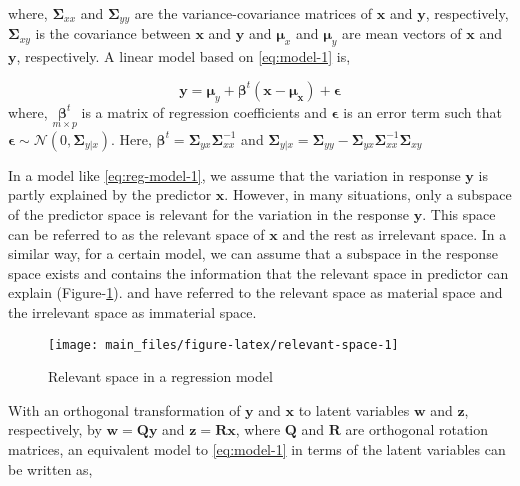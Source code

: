 \documentclass[review]{elsarticle}
\begin{document}
where, \(\boldsymbol{\Sigma}_{xx}\) and \(\boldsymbol{\Sigma}_{yy}\) are the variance-covariance matrices of \(\mathbf{x}\) and \(\mathbf{y}\), respectively, \(\boldsymbol{\Sigma}_{xy}\) is the covariance between \(\mathbf{x}\) and \(\mathbf{y}\) and \(\boldsymbol{\mu}_x\) and \(\boldsymbol{\mu}_y\) are mean vectors of \(\mathbf{x}\) and \(\mathbf{y}\), respectively. A linear model based on \eqref{eq:model-1} is,

\begin{equation}
\mathbf{y} = \boldsymbol{\mu}_y + 
  \boldsymbol{\beta}^t(\mathbf{x} - \boldsymbol{\mu_x}) + 
  \boldsymbol{\epsilon}
\label{eq:reg-model-1}
\end{equation}
where, \(\underset{m\times p}{\boldsymbol{\beta}^t}\) is a matrix of regression
coefficients and \(\boldsymbol{\epsilon}\) is an error term such that
\(\boldsymbol{\epsilon} \sim \mathcal{N}(0, \boldsymbol{\Sigma}_{y|x})\). Here, \(\boldsymbol{\beta}^t = \mathbf{\Sigma}_{yx}\mathbf{\Sigma}_{xx}^{-1}\) and \(\boldsymbol{\Sigma}_{y|x} = \boldsymbol{\Sigma}_{yy} - \boldsymbol{\Sigma}_{yx}\boldsymbol{\Sigma}_{xx}^{-1}\boldsymbol{\Sigma}_{xy}\)

In a model like \eqref{eq:reg-model-1}, we assume that the variation in response \(\mathbf{y}\) is partly explained by the predictor \(\mathbf{x}\). However, in many situations, only a subspace of the predictor space is relevant for the variation in the response \(\mathbf{y}\). This space can be referred to as the relevant space of \(\mathbf{x}\) and the rest as irrelevant space. In a similar way, for a certain model, we can assume that a subspace in the response space exists and contains the information that the relevant space in predictor can explain (Figure-\ref{fig:relevant-space}). \citet{cook2010envelope} and \citet{cook2015simultaneous} have referred to the relevant space as material space and the irrelevant space as immaterial space.

\begin{figure}

{\centering \texttt{[image: main\_files/figure-latex/relevant-space-1]} 

}

\caption{Relevant space in a regression model}\label{fig:relevant-space}
\end{figure}

With an orthogonal transformation of \(\mathbf{y}\) and \(\mathbf{x}\) to latent variables \(\mathbf{w}\) and \(\mathbf{z}\), respectively, by \(\mathbf{w=Qy}\) and \(\mathbf{z = Rx}\), where \(\mathbf{Q}\) and \(\mathbf{R}\) are orthogonal rotation matrices, an equivalent model to \eqref{eq:model-1} in terms of the latent variables can be written as,
\end{document}
